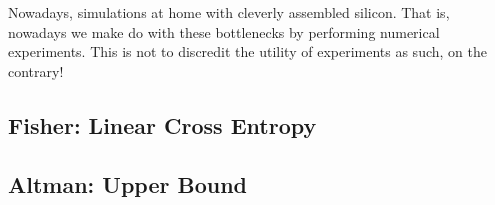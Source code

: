 Nowadays, 
simulations at home with cleverly assembled silicon.  That is, nowadays we make
do with these bottlenecks by performing numerical experiments. This is not to
discredit the utility of experiments as such, on the contrary! 


\subsection{Fisher: Linear Cross Entropy}
\cite{liCrossEntropyBenchmark2023}

\subsection{Altman: Upper Bound}
\cite{garrattProbingPostmeasurementEntanglement2023}

